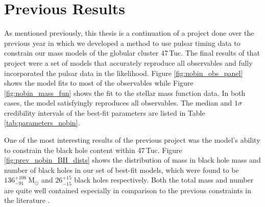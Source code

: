 


\section{Previous Results}

As mentioned previously, this thesis is a continuation of a project done over the previous year in
which we developed a method to use pulsar timing data to constrain our mass models of the globular
cluster 47\,Tuc. The final results of that project were a set of models that accurately reproduce
all observables and fully incorporated the pulsar data in the likelihood. Figure
\ref{fig:nobin_obs_panel} shows the model fits to most of the observables while Figure
\ref{fig:nobin_mass_fun} shows the fit to the stellar mass function data. In both cases, the model
satisfyingly reproduces all observables. The median and $1\sigma$ credibility intervals of the
best-fit parameters are listed in Table \ref{tab:parameters_nobin}.

One of the most interesting results of the previous project was the model's ability to constrain the
black hole content within 47\,Tuc. Figure \ref{fig:prev_nobin_BH_dists} shows the distribution of
mass in black hole mass and number of black holes in our set of best-fit models, which were found to
be $136^{+108}_{-91} \ \mathrm{M}_\odot$ and $26^{+15}_{-15}$ black holes respectively. Both the
total mass and number are quite well contained especially in comparison to the previous constraints
in the literature \citep[see e.g.][]{Henault-Brunet2020,Weatherford2019}.




